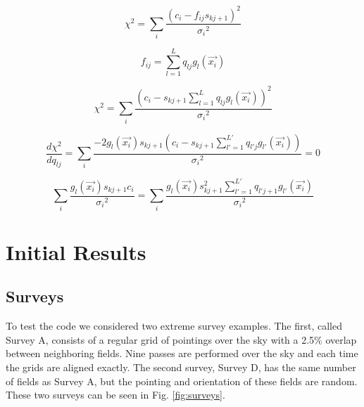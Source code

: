 \documentclass[12pt,a4paper,twoside]{article}
\begin{document}
\begin{equation}
\chi^2 = \sum_{i} \frac{(c_i-f_{ij}s_{kj+1})^2}{{\sigma_i}^2}
\end{equation}

\begin{equation}
f_{ij} = \sum_{l = 1}^L q_{lj} g_l(\vec{x_i})
\end{equation}

\begin{equation}
\chi^2 = \sum_{i} \frac{(c_i- s_{kj+1} \sum_{l = 1}^L q_{lj} g_l(\vec{x_i}))^2}{{\sigma_i}^2}
\end{equation}

\begin{equation}
\frac{d\chi^2}{dq_{lj}} = \sum_{i} \frac{-2 g_l(\vec{x_i}) s_{kj+1} (c_i- s_{kj+1} \sum_{l' = 1}^{L'} q_{l'j} g_{l'}(\vec{x_i}))}{{\sigma_i}^2} = 0
\end{equation}

\begin{equation}
\sum_{i} \frac{g_l(\vec{x_i}) s_{kj+1} c_i}{{\sigma_i}^2} = \sum_{i} \frac{g_l(\vec{x_i}) s_{kj+1}^2 \sum_{l' = 1}^{L'} q_{l'j+1} g_{l'}(\vec{x_i})}{{\sigma_i}^2}
\end{equation}

\section{Initial Results}
\subsection{Surveys}
To test the code we considered two extreme survey examples. The first, called Survey A, consists of a regular grid of pointings over the sky with a 2.5\% overlap between neighboring fields. Nine passes are performed over the sky and each time the grids are aligned exactly. The second survey, Survey D, has the same number of fields as Survey A, but the pointing and orientation of these fields are random. These two surveys can be seen in Fig. \ref{fig:surveys}.
\end{document}
